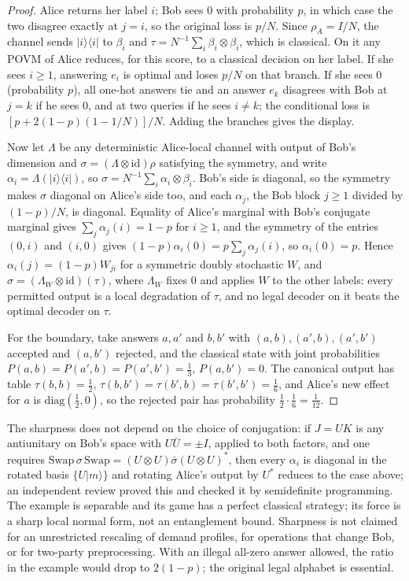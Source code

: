 \begin{proof}
Alice returns her label $i$; Bob sees $0$ with probability $p$, in which case the two disagree exactly at $j=i$, so the
original loss is $p/N$. Since $\rho_A=I/N$, the channel sends $|i\rangle\langle i|$ to $\beta_i$ and
$\tau=N^{-1}\sum_i\beta_i\otimes\beta_i$, which is classical. On it any POVM of Alice reduces, for this score, to a classical
decision on her label. If she sees $i\ge1$, answering $e_i$ is optimal and loses $p/N$ on that branch. If she sees $0$
(probability $p$), all one-hot answers tie and an answer $e_k$ disagrees with Bob at $j=k$ if he sees $0$, and at two
queries if he sees $i\ne k$; the conditional loss is $[p+2(1-p)(1-1/N)]/N$. Adding the branches gives the display.

Now let $\Lambda$ be any deterministic Alice-local channel with output of Bob's dimension and $\sigma=(\Lambda\otimes\mathrm{id})\rho$
satisfying the symmetry, and write $\alpha_i=\Lambda(|i\rangle\langle i|)$, so $\sigma=N^{-1}\sum_i\alpha_i\otimes\beta_i$. Bob's side is
diagonal, so the symmetry makes $\sigma$ diagonal on Alice's side too, and each $\alpha_j$, the Bob block $j\ge1$ divided by
$(1-p)/N$, is diagonal. Equality of Alice's marginal with Bob's conjugate marginal gives $\sum_j\alpha_j(i)=1-p$ for $i\ge1$,
and the symmetry of the entries $(0,i)$ and $(i,0)$ gives $(1-p)\alpha_i(0)=p\sum_j\alpha_j(i)$, so $\alpha_i(0)=p$. Hence
$\alpha_i(j)=(1-p)W_{ji}$ for a symmetric doubly stochastic $W$, and $\sigma=(\Lambda_W\otimes\mathrm{id})(\tau)$, where $\Lambda_W$ fixes
$0$ and applies $W$ to the other labels: every permitted output is a local degradation of $\tau$, and no legal decoder on
it beats the optimal decoder on $\tau$.

For the boundary, take answers $a,a'$ and $b,b'$ with $(a,b),(a',b),(a',b')$ accepted and $(a,b')$ rejected, and the
classical state with joint probabilities $P(a,b)=P(a',b)=P(a',b')=\frac13$, $P(a,b')=0$. The canonical output has table
$\tau(b,b)=\frac12$, $\tau(b,b')=\tau(b',b)=\tau(b',b')=\frac16$, and Alice's new effect for $a$ is $\mathrm{diag}(\frac12,0)$, so
the rejected pair has probability $\frac12\cdot\frac16=\frac1{12}$.
\end{proof}

The sharpness does not depend on the choice of conjugation: if $J=UK$ is any antiunitary on Bob's space with $U\bar U=\pm I$,
applied to both factors, and one requires $\mathrm{Swap}\,\sigma\,\mathrm{Swap}=(U\otimes U)\bar\sigma(U\otimes U)^*$, then every
$\alpha_i$ is diagonal in the rotated basis $\{U|m\rangle\}$ and rotating Alice's output by $U^*$ reduces to the case above; an
independent review proved this and checked it by semidefinite programming. The example is separable and its game has a
perfect classical strategy; its force is a sharp local normal form, not an entanglement bound. Sharpness is not claimed for an unrestricted rescaling of demand profiles, for operations that change
Bob, or for two-party preprocessing. With an illegal all-zero answer allowed, the ratio in the example would drop to
$2(1-p)$; the original legal alphabet is essential.

